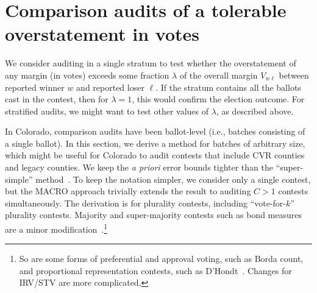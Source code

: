 \section{Comparison audits of a tolerable overstatement in votes}
\label{sec:comparisonError}

We consider auditing in a single stratum to test whether the overstatement of any margin
(in votes) exceeds some fraction $\lambda$ of the overall margin $V_{w\ell}$ between
reported winner $w$ and reported loser $\ell$.
If the stratum contains all the ballots cast in the contest, then for $\lambda = 1$, this 
would confirm the election outcome.
For stratified audits, we might want to test other values of $\lambda$, as described above.

In Colorado, comparison audits have been ballot-level (i.e., batches consisting of a single
ballot). 
In this section, we derive a method for batches of arbitrary size, which might be useful
for Colorado to audit contests that include CVR counties and legacy counties.
We keep the \emph{a priori} error bounds tighter than the ``super-simple'' 
method~\citep{stark10d}.
To keep the notation simpler, we consider only a single contest, but the 
MACRO approach \citep{stark09c,stark10d} trivially extends the result to 
auditing $C>1$ contests simultaneously.
The derivation is for plurality contests, including ``vote-for-$k$'' plurality contests.
Majority and super-majority contests such as bond measures are a minor 
modification~\citep{stark08a}.\footnote{%
  So are some forms of preferential and approval voting, such as Borda count, and
  proportional representation contests, such as D'Hondt~\citep{starkTeague14}.
  Changes for IRV/STV are more complicated.
}

